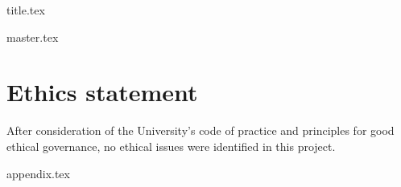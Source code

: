 \documentclass[a4paper, 12pt]{article}
\begin{document}
{title.tex}



\setcounter{secnumdepth}{4}



\tableofcontents

\newpage

\listoffigures

\newpage

\listoftables


% 





\newpage



{master.tex}



\newpage







\section{Ethics statement}

After consideration of the University's code of practice and principles for good ethical governance, no ethical issues were identified in this project. 


\newpage

{appendix.tex}





\end{document}
